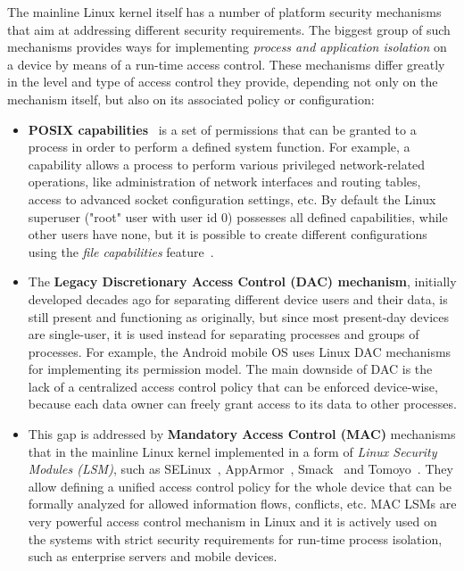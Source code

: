 The mainline Linux kernel itself has a number of platform security mechanisms that aim at addressing different security requirements. The biggest group of such mechanisms provides ways for implementing \textit{process and application isolation} on a device by means of a run-time access control. These mechanisms differ greatly in the level and type of access control they provide, depending not only on the mechanism itself, but also on its associated policy or configuration:

\begin{itemize}
	\item \textbf{POSIX capabilities}~\cite{caps} is a set of permissions that can be granted to a process in order to perform a defined system function. For example, a  capability allows a process to perform various privileged network-related operations, like administration of network interfaces and routing tables, access to advanced socket configuration settings, etc. By default the Linux superuser ("root" user with user id 0) possesses all defined capabilities, while other users have none, but it is possible to create different configurations using the \textit{file capabilities} feature~\cite{filecaps}. 
	\item The \textbf{Legacy Discretionary Access Control (DAC) mechanism}, initially developed decades ago for separating different device users and their data, is still present and functioning as originally, but since most present-day devices are single-user, it is used instead for separating processes and groups of processes. For example, the Android mobile OS uses Linux DAC mechanisms for implementing its permission model. The main downside of DAC is the lack of a centralized access control policy that can be enforced device-wise, because each data owner can freely grant access to its data to other processes. 
	\item This gap is addressed by \textbf{Mandatory Access Control (MAC)} mechanisms that in the mainline Linux kernel implemented in a form of \textit{Linux Security Modules (LSM)}, such as SELinux~\cite{smalley2001implementing}, AppArmor~\cite{bauer2006paranoid}, Smack~\cite{bauer2006paranoid} and Tomoyo~\cite{tomoyo}. They allow defining a unified access control policy for the whole device that can be formally analyzed for allowed information flows, conflicts, etc. MAC LSMs are very powerful access control mechanism in Linux and it is actively used on the systems with strict security requirements for run-time process isolation, such as enterprise servers and mobile devices. 

\end{itemize}
